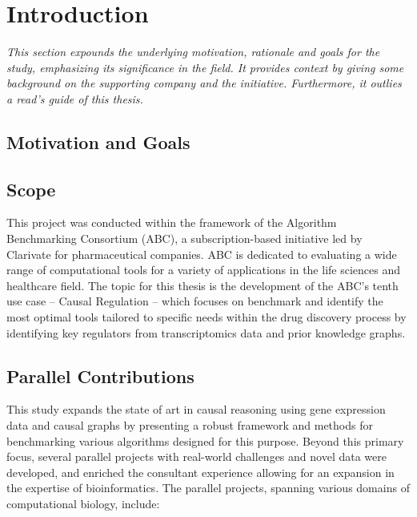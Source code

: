 
%
\chapter{Introduction}
\label{cha:introduction}

\textit{This section expounds the underlying motivation, rationale and goals for the study, emphasizing its significance in the field. It provides context by giving some background on the supporting company and the initiative. Furthermore, it outlies a read’s guide of this thesis.}

\section{Motivation and Goals} %
\label{sec:motivation_and_goals}


\section{Scope} %
\label{sec:scope}
This project was conducted within the framework of the Algorithm Benchmarking Consortium (ABC), a subscription-based initiative led by Clarivate for pharmaceutical companies. ABC is dedicated to evaluating a wide range of computational tools for a variety of applications in the life sciences and healthcare field. The topic for this thesis is the development of the ABC’s tenth use case – Causal Regulation – which focuses on benchmark and identify the most optimal tools tailored to specific needs within the drug discovery process by identifying key regulators from transcriptomics data and prior knowledge graphs.

\section{Parallel Contributions} %
\label{sec:parallel_contributions}

This study expands the state of art in causal reasoning using gene expression data and causal graphs by presenting a robust framework and methods for benchmarking various algorithms designed for this purpose. Beyond this primary focus, several parallel projects with real-world challenges and novel data were developed, and enriched the consultant experience allowing for an expansion in the expertise of bioinformatics. The parallel projects, spanning various domains of computational biology, include:

